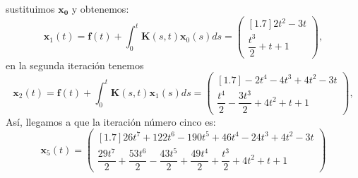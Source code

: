 \begin{ejemplo}
	sustituimos $\textbf{x}_\textbf{0}$ y obtenemos:
	\begin{equation}
		\textbf{x}_{1}(t) = \textbf{f}(t) + \int_0^t \textbf{K}(s,t)\textbf{x}_0(s)ds = \begin{pmatrix}[1.7]	2t^2 - 3t \\ \dfrac{t^3}{2} +t+1	\end{pmatrix},
	\end{equation}
	en la segunda iteración tenemos
	\begin{equation}
		\textbf{x}_{2}(t) = \textbf{f}(t) + \int_0^t \textbf{K}(s,t)\textbf{x}_1(s)ds = \begin{pmatrix}[1.7] -2t^4-4t^3+4t^2-3t\\ \dfrac{t^4}{2}-\dfrac{3t^3}{2}+4t^2+t+1	\end{pmatrix},
	\end{equation}
	Así, llegamos a que la iteración número cinco es:
	\begin{equation}
		\textbf{x}_5(t) = \begin{pmatrix}[1.7]
			26t^7 + 122t^6 - 190t^5 + 46t^4 - 24t^3 + 4t^2-3t   \\ \dfrac{29t^7}{2}+\dfrac{53t^6}{2}-\dfrac{43t^5}{2}+\dfrac{49t^4}{2}+\dfrac{t^3}{2} +4t^2+t+1
		\end{pmatrix}
	\end{equation}
\end{ejemplo}
\endinput
-